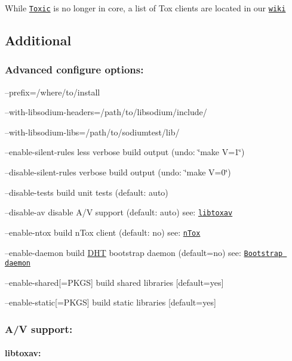 While \href{https://github.com/tox/toxic}{\tt Toxic} is no longer in core, a list of Tox clients are located in our \href{http://wiki.tox.im/client}{\tt wiki}

\label{_additional}%
 \subsection*{Additional}

\label{_aconf}%
 \subsubsection*{Advanced configure options\+:}


\begin{DoxyItemize}
\item --prefix=/where/to/install
\item --with-\/libsodium-\/headers=/path/to/libsodium/include/
\item --with-\/libsodium-\/libs=/path/to/sodiumtest/lib/
\item --enable-\/silent-\/rules less verbose build output (undo\+: \char`\"{}make V=1\char`\"{})
\item --disable-\/silent-\/rules verbose build output (undo\+: \char`\"{}make V=0\char`\"{})
\item --disable-\/tests build unit tests (default\+: auto)
\item --disable-\/av disable A/\+V support (default\+: auto) see\+: \href{#libtoxav}{\tt libtoxav}
\item --enable-\/ntox build n\+Tox client (default\+: no) see\+: \href{#ntox}{\tt n\+Tox}
\item --enable-\/daemon build \hyperlink{struct_d_h_t}{D\+H\+T} bootstrap daemon (default=no) see\+: \href{#bootstrapd}{\tt Bootstrap daemon}
\item --enable-\/shared\mbox{[}=P\+K\+G\+S\mbox{]} build shared libraries \mbox{[}default=yes\mbox{]}
\item --enable-\/static\mbox{[}=P\+K\+G\+S\mbox{]} build static libraries \mbox{[}default=yes\mbox{]}
\end{DoxyItemize}

\label{_av}%
 \subsubsection*{A/\+V support\+:}

\label{_libtoxav}%
 \paragraph*{libtoxav\+:}


